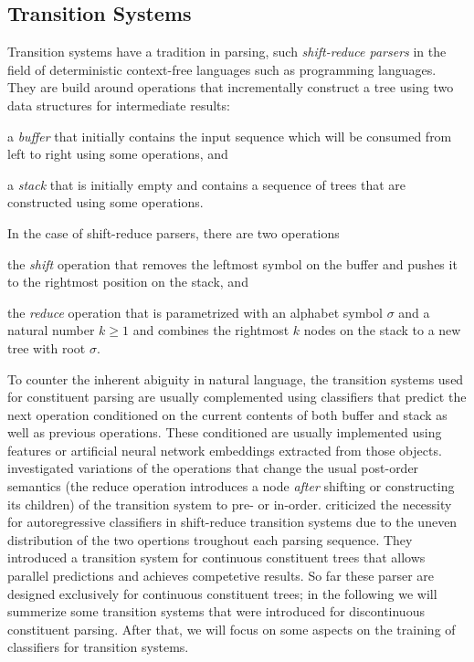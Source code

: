 \documentclass[../document.tex]{subfiles}
\begin{document}
    \subsection{Transition Systems}\label{sec:literature:transition}
    Transition systems have a tradition in parsing, such \emph{shift-reduce parsers} in the field of deterministic context-free languages such as programming languages. \citep{}
    They are build around operations that incrementally construct a tree using two data structures for intermediate results:
    \begin{compactitem}
        \item a \emph{buffer} that initially contains the input sequence which will be consumed from left to right using some operations, and
        \item a \emph{stack} that is initially empty and contains a sequence of trees that are constructed using some operations.
    \end{compactitem}
    In the case of shift-reduce parsers, there are two operations
    \begin{compactitem}
        \item the \emph{shift} operation that removes the leftmost symbol on the buffer and pushes it to the rightmost position on the stack, and
        \item the \emph{reduce} operation that is parametrized with an alphabet symbol \(\sigma\) and a natural number \(k \ge 1\) and combines the rightmost \(k\) nodes on the stack to a new tree with root \(\sigma\).
    \end{compactitem}
    To counter the inherent abiguity in natural language, the transition systems used for constituent parsing are usually complemented using classifiers that predict the next operation conditioned on the current contents of both buffer and stack as well as previous operations. \citep{}
    These conditioned are usually implemented using features or artificial neural network embeddings extracted from those objects.
    \citet{liu-zhang-2017-order} investigated variations of the operations that change the usual post-order semantics (the reduce operation introduces a node \emph{after} shifting or constructing its children) of the transition system to pre- or in-order.
    \cite{kitaev-klein-2020-tetra} criticized the necessity for autoregressive classifiers in shift-reduce transition systems due to the uneven distribution of the two opertions troughout each parsing sequence.
    They introduced a transition system for continuous constituent trees that allows parallel predictions and achieves competetive results.
    So far these parser are designed exclusively for continuous constituent trees; in the following we will summerize some transition systems that were introduced for discontinuous constituent parsing.
    After that, we will focus on some aspects on the training of classifiers for transition systems.
\end{document}
